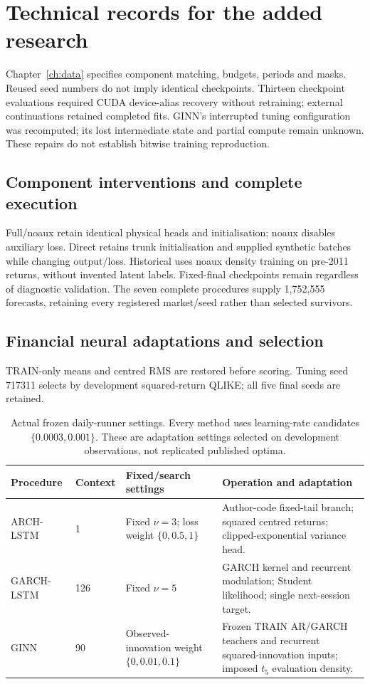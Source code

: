 \section{Technical records for the added research}
\label{sec:new-research-methods}

Chapter~\ref{ch:data} specifies component matching, budgets, periods and masks. Reused seed numbers do not imply identical checkpoints. Thirteen checkpoint evaluations required CUDA device-alias recovery without retraining; external continuations retained completed fits. GINN's interrupted tuning configuration was recomputed; its lost intermediate state and partial compute remain unknown. These repairs do not establish bitwise training reproduction.

\subsection{Component interventions and complete execution}

Full/noaux retain identical physical heads and initialisation; noaux disables auxiliary loss. Direct retains trunk initialisation and supplied synthetic batches while changing output/loss. Historical uses noaux density training on pre-2011 returns, without invented latent labels. Fixed-final checkpoints remain regardless of diagnostic validation. The seven complete procedures supply 1,752,555 forecasts, retaining every registered market/seed rather than selected survivors.

\subsection{Financial neural adaptations and selection}

TRAIN-only means and centred RMS are restored before scoring. Tuning seed 717311 selects by development squared-return QLIKE; all five final seeds are retained.

\begin{table}[!htbp]\centering\small
\caption[Registered daily neural grids]{Actual frozen daily-runner settings. Every method uses learning-rate candidates $\{0.0003,0.001\}$. These are adaptation settings selected on development observations, not replicated published optima.}
\label{tab:new-daily-grids}
\begin{tabular}{@{}p{2.7cm}p{1.4cm}p{3.3cm}p{6.2cm}@{}}
\toprule Procedure & Context & Fixed/search settings & Operation and adaptation \\
\midrule
ARCH-LSTM & 1 & Fixed $\nu=3$; loss weight $\{0,0.5,1\}$ & Author-code fixed-tail branch; squared centred returns; clipped-exponential variance head. \\
GARCH-LSTM & 126 & Fixed $\nu=5$ & GARCH kernel and recurrent modulation; Student likelihood; single next-session target. \\
GINN & 90 & Observed-innovation weight $\{0,0.01,0.1\}$ & Frozen TRAIN AR/GARCH teachers and recurrent squared-innovation inputs; imposed $t_5$ evaluation density. \\
\bottomrule\end{tabular}
\end{table}

